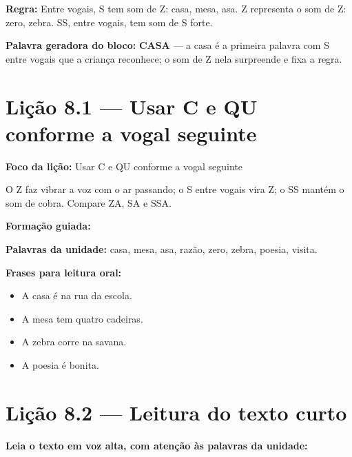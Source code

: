 \textbf{Regra:} Entre vogais, S tem som de Z: casa, mesa, asa. Z representa o som de Z: zero, zebra. SS, entre vogais, tem som de S forte.

\textbf{Palavra geradora do bloco:} \textbf{CASA} --- a casa é a primeira palavra com S entre vogais que a criança reconhece; o som de Z nela surpreende e fixa a regra.

\section{Lição 8.1 --- Usar C e QU conforme a vogal seguinte}

\textbf{Foco da lição:} Usar C e QU conforme a vogal seguinte


\begin{boquinha}
O Z faz vibrar a voz com o ar passando; o S entre vogais vira Z; o SS mantém o som de cobra. Compare ZA, SA e SSA.
\end{boquinha}

\noindent\textbf{Formação guiada:}

\begin{center}
\end{center}

\noindent\textbf{Palavras da unidade:} casa, mesa, asa, razão, zero, zebra, poesia, visita.

\noindent\textbf{Frases para leitura oral:}
\begin{itemize}[leftmargin=1.6em]
  \item A casa é na rua da escola.
  \item A mesa tem quatro cadeiras.
  \item A zebra corre na savana.
  \item A poesia é bonita.
\end{itemize}

\section{Lição 8.2 --- Leitura do texto curto}

\noindent\textbf{Leia o texto em voz alta, com atenção às palavras da unidade:}


